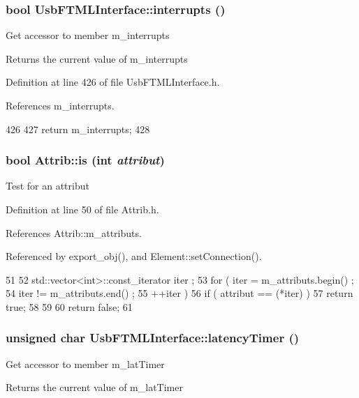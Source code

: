 \hypertarget{classUsbFTMLInterface_afab1c2175bd2bca261ffa2b8ee67df2d}{
\subsubsection[{interrupts}]{\setlength{\rightskip}{0pt plus 5cm}bool UsbFTMLInterface::interrupts ()}}
\label{classUsbFTMLInterface_afab1c2175bd2bca261ffa2b8ee67df2d}
Get accessor to member m\_\-interrupts \begin{DoxyReturn}{Returns}
the current value of m\_\-interrupts 
\end{DoxyReturn}


Definition at line 426 of file UsbFTMLInterface.h.

References m\_\-interrupts.


\begin{DoxyCode}
426                      {
427     return m_interrupts;
428   }
\end{DoxyCode}
\hypertarget{classAttrib_a704f26af560909ad22065083bb7d4c34}{
\subsubsection[{is}]{\setlength{\rightskip}{0pt plus 5cm}bool Attrib::is (int {\em attribut})}}
\label{classAttrib_a704f26af560909ad22065083bb7d4c34}
Test for an attribut 

Definition at line 50 of file Attrib.h.

References Attrib::m\_\-attributs.

Referenced by export\_\-obj(), and Element::setConnection().


\begin{DoxyCode}
51   {
52     std::vector<int>::const_iterator iter ;
53     for ( iter  = m_attributs.begin() ;
54           iter != m_attributs.end()   ;
55           ++iter ) {
56       if ( attribut == (*iter) ) {
57         return true;
58       }
59     }
60     return false;
61   }
\end{DoxyCode}
\hypertarget{classUsbFTMLInterface_ac94dcd155b2e060d5fe04ccfbbb4de8d}{
\subsubsection[{latencyTimer}]{\setlength{\rightskip}{0pt plus 5cm}unsigned char UsbFTMLInterface::latencyTimer ()}}
\label{classUsbFTMLInterface_ac94dcd155b2e060d5fe04ccfbbb4de8d}
Get accessor to member m\_\-latTimer \begin{DoxyReturn}{Returns}
the current value of m\_\-latTimer 
\end{DoxyReturn}


